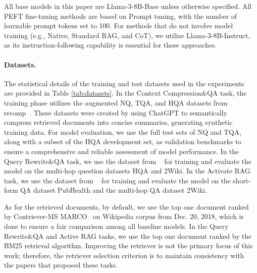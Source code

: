 All base models in this paper are Llama-3-8B-Base unless otherwise specified. All PEFT fine-tuning methods are based on Prompt tuning, with the number of learnable prompt tokens set to 100. For methods that do not involve model training (e.g., Native, Standard RAG, and CoT), we utilize Llama-3-8B-Instruct, as its instruction-following capability is essential for these approaches.


\paragraph{Datasets.} The statistical details of the training and test datasets used in the experiments are provided in Table \ref{tab:datasets}. In the Context Compression\&QA task, the training phase utilizes the augmented NQ, TQA, and HQA datasets from recomp~\cite{xu2023recomp}. These datasets were created by using ChatGPT to semantically compress retrieved documents into concise summaries, generating synthetic training data. For model evaluation, we use the full test sets of NQ and TQA, along with a subset of the HQA development set, as validation benchmarks to ensure a comprehensive and reliable assessment of model performance. In the Query Rewrite\&QA task, we use the dataset from ~\citet{ma2023query} for training and evaluate the model on the multi-hop question datasets HQA and 2Wiki. In the Activate RAG task, we use the dataset from ~\citet{lyu2024retrieve} for training and evaluate the model on the short-form QA dataset PubHealth and the multi-hop QA dataset 2Wiki.


As for the retrieved documents, by default, we use the top one document ranked by Contriever-MS MARCO~\cite{izacard2021unsupervised} on Wikipedia corpus from Dec. 20, 2018, which is done to ensure a fair comparison among all baseline models. In the Query Rewrite\&QA and Active RAG tasks,  we use the top one document ranked by the BM25 retrieval algorithm. Improving the retriever is not the primary focus of this work; therefore, the retriever selection criterion is to maintain consistency with the papers that proposed these tasks.


